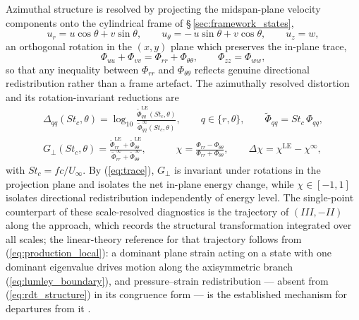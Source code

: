 \documentclass[lineno]{JFM-FLM_Au}
\begin{document}
Azimuthal structure is resolved by projecting the midspan-plane velocity
components onto the cylindrical frame of \S\,\ref{sec:framework_states},
\begin{equation}
  u_r = u\cos\theta + v\sin\theta,
  \qquad
  u_\theta = -\,u\sin\theta + v\cos\theta,
  \qquad
  u_z = w,
  \label{eq:projection}
\end{equation}
an orthogonal rotation in the $(x,y)$ plane which preserves the in-plane
trace,
\begin{equation}
  \Phi_{uu} + \Phi_{vv} = \Phi_{rr} + \Phi_{\theta\theta},
  \qquad
  \Phi_{zz} = \Phi_{ww},
  \label{eq:trace}
\end{equation}
so that any inequality between $\Phi_{rr}$ and $\Phi_{\theta\theta}$
reflects genuine directional redistribution rather than a frame artefact.
The azimuthally resolved distortion and its rotation-invariant reductions
are
\begin{gather}
  \Delta_{qq}(St_c,\theta)
  = \log_{10}
    \frac{\widetilde{\Phi}^{\mathrm{LE}}_{qq}(St_c,\theta)}
         {\widetilde{\Phi}^{\infty}_{qq}(St_c,\theta)},
  \qquad q \in \{r,\theta\},
  \qquad
  \widetilde{\Phi}_{qq} = St_c\,\Phi_{qq},
  \label{eq:delta}
  \\[2pt]
  G_\perp(St_c,\theta)
  = \frac{\widetilde{\Phi}^{\mathrm{LE}}_{rr}
        + \widetilde{\Phi}^{\mathrm{LE}}_{\theta\theta}}
         {\widetilde{\Phi}^{\infty}_{rr}
        + \widetilde{\Phi}^{\infty}_{\theta\theta}},
  \qquad\quad
  \chi
  = \frac{\Phi_{rr} - \Phi_{\theta\theta}}
         {\Phi_{rr} + \Phi_{\theta\theta}},
  \qquad
  \Delta\chi = \chi^{\mathrm{LE}} - \chi^{\infty},
  \label{eq:tracegain_chi}
\end{gather}
with $St_c = fc/U_\infty$. By (\ref{eq:trace}), $G_\perp$ is invariant
under rotations in the projection plane and isolates the net in-plane
energy change, while $\chi \in [-1,1]$ isolates directional
redistribution independently of energy level. The single-point
counterpart of these scale-resolved diagnostics is the trajectory of
$(III,-II)$ along the approach, which records the structural
transformation integrated over all scales; the linear-theory reference
for that trajectory follows from
(\ref{eq:production_local}): a dominant plane strain acting on a state
with one dominant eigenvalue drives motion along the axisymmetric branch
(\ref{eq:lumley_boundary}), and pressure--strain redistribution --- absent
from (\ref{eq:rdt_structure}) in its congruence form --- is the
established mechanism for departures from it
\citep{SpezialeSarkarGatski1991,DurbinReif2017}.
\end{document}
